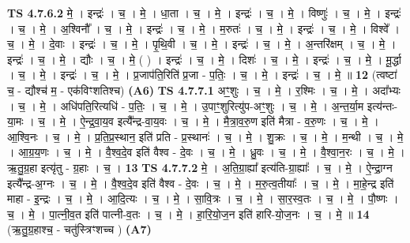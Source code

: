 \documentclass[17pt]{extarticle}
\begin{document}
                  \newline
                                \textbf{ TS 4.7.6.2} \newline
                  मे॒ । इन्द्रः॑ । च॒ । मे॒ । धा॒ता । च॒ । मे॒ । इन्द्रः॑ । च॒ । मे॒ । विष्णुः॑ । च॒ । मे॒ । इन्द्रः॑ । च॒ । मे॒ । अ॒श्विनौ᳚ । च॒ । मे॒ । इन्द्रः॑ । च॒ । मे॒ । म॒रुतः॑ । च॒ । मे॒ । इन्द्रः॑ । च॒ । मे॒ । विश्वे᳚ । च॒ । मे॒ । दे॒वाः । इन्द्रः॑ । च॒ । मे॒ । पृ॒थि॒वी । च॒ । मे॒ । इन्द्रः॑ । च॒ । मे॒ । अ॒न्तरि॑क्षम् । च॒ । मे॒ । इन्द्रः॑ । च॒ । मे॒ । द्यौः । च॒ । मे॒ ( ) । इन्द्रः॑ । च॒ । मे॒ । दिशः॑ । च॒ । मे॒ । इन्द्रः॑ । च॒ । मे॒ । मू॒र्द्धा । च॒ । मे॒ । इन्द्रः॑ । च॒ । मे॒ । प्र॒जाप॑ति॒रिति॑ प्र॒जा - प॒तिः॒ । च॒ । मे॒ । इन्द्रः॑ । च॒ । मे॒ ॥ \textbf{  12 } \newline
                  \newline
                      (त्वष्टा॑ च॒ - द्यौश्च॑ म॒ - एक॑विꣳशतिश्च)  \textbf{(A6)} \newline \newline
                                \textbf{ TS 4.7.7.1} \newline
                  अꣳ॒॒शुः । च॒ । मे॒ । र॒श्मिः । च॒ । मे॒ । अदा᳚भ्यः । च॒ । मे॒ । अधि॑पति॒रित्यधि॑ - प॒तिः॒ । च॒ । मे॒ । उ॒पाꣳ॒॒शुरित्यु॑प-अꣳ॒॒शुः । च॒ । मे॒ । अ॒न्त॒र्या॒म इत्य॑न्तः-या॒मः । च॒ । मे॒ । ऐ॒न्द्र॒वा॒य॒व इत्यै᳚न्द्र-वा॒य॒वः । च॒ । मे॒ । मै॒त्रा॒व॒रु॒ण इति॑ मैत्रा - व॒रु॒णः । च॒ । मे॒ । आ॒श्वि॒नः । च॒ । मे॒ । प्र॒ति॒प्र॒स्थान॒ इति॑ प्रति - प्र॒स्थानः॑ । च॒ । मे॒ । शु॒क्रः । च॒ । मे॒ । म॒न्थी । च॒ । मे॒ । आ॒ग्र॒य॒णः । च॒ । मे॒ । वै॒श्व॒दे॒व इति॑ वैश्व - दे॒वः । च॒ । मे॒ । ध्रु॒वः । च॒ । मे॒ । वै॒श्वा॒न॒रः । च॒ । मे॒ । ऋ॒तु॒ग्र॒हा इत्यृ॑तु - ग्र॒हाः । च॒ । \textbf{  13} \newline
                  \newline
                                \textbf{ TS 4.7.7.2} \newline
                  मे॒ । अ॒ति॒ग्रा॒ह्या᳚ इत्य॑ति-ग्रा॒ह्याः᳚ । च॒ । मे॒ । ऐ॒न्द्रा॒ग्न इत्यै᳚न्द्र-अ॒ग्नः । च॒ । मे॒ । वै॒श्व॒दे॒व इति॑ वैश्व - दे॒वः । च॒ । मे॒ । म॒रु॒त्व॒तीयाः᳚ । च॒ । मे॒ । मा॒हे॒न्द्र इति॑ माहा - इ॒न्द्रः । च॒ । मे॒ । आ॒दि॒त्यः । च॒ । मे॒ । सा॒वि॒त्रः । च॒ । मे॒ । सा॒र॒स्व॒तः । च॒ । मे॒ । पौ॒ष्णः । च॒ । मे॒ । पा॒त्नी॒व॒त इति॑ पात्नी-व॒तः । च॒ । मे॒ । हा॒रि॒यो॒ज॒न इति॑ हारि-यो॒ज॒नः । च॒ । मे॒ ॥ \textbf{  14} \newline
                  \newline
                      (ऋ॒तु॒ग्र॒हाश्च॒ - चतु॑स्त्रिꣳशच्च )  \textbf{(A7)} \newline \newline
\end{document}
